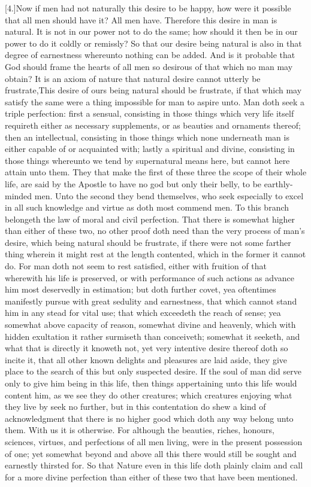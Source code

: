 [4.]Now if men had not naturally this desire to be happy, how were it possible that all men should have it? All men have. Therefore this desire in man is natural. It is not in our power not to do the same; how should it then be in our power to do it coldly or remissly? So that our desire being  natural is also in that degree of earnestness whereunto nothing can be added. And is it probable that God should frame the hearts of all men so desirous of that which no man may obtain? It is an axiom of nature that natural desire cannot utterly be frustrate,This desire of ours being natural should be frustrate, if that which may satisfy the same were a thing impossible for man to aspire unto. Man doth seek a triple perfection: first a sensual, consisting in those things which very life itself requireth either as necessary supplements, or as beauties and ornaments thereof; then an intellectual, consisting in those things which none underneath man is either capable of or acquainted with; lastly a spiritual and divine, consisting in those things whereunto we tend by supernatural means here, but cannot here attain unto them. They that make the first of these three the scope of their whole life, are said by the Apostle to have no god but only their belly, to be earthly-minded men. Unto the second they bend themselves, who seek especially to excel in all such knowledge and virtue as doth most commend men. To this branch belongeth the law of moral and civil perfection. That there is somewhat higher than either of these two, no other proof doth need than the very process of man’s desire, which being natural should be frustrate, if there were not some farther thing wherein it might rest at the length contented, which in the former it cannot do. For man doth not seem to rest satisfied, either with fruition of that wherewith his life is preserved, or with performance of such actions as advance him most deservedly in estimation; but doth further covet, yea oftentimes manifestly pursue with great sedulity and earnestness, that which cannot stand him in any stead for vital use; that which exceedeth the reach of sense; yea somewhat above capacity of reason, somewhat divine and heavenly, which with hidden exultation it rather surmiseth than conceiveth; somewhat it seeketh, and what that is directly it knoweth not, yet very intentive desire thereof doth so incite it, that all other known delights and pleasures are  laid aside, they give place to the search of this but only suspected desire. If the soul of man did serve only to give him being in this life, then things appertaining unto this life would content him, as we see they do other creatures; which creatures enjoying what they live by seek no further, but in this contentation do shew a kind of acknowledgment that there is no higher good which doth any way belong unto them. With us it is otherwise. For although the beauties, riches, honours, sciences, virtues, and perfections of all men living, were in the present possession of one; yet somewhat beyond and above all this there would still be sought and earnestly thirsted for. So that Nature even in this life doth plainly claim and call for a more divine perfection than either of these two that have been mentioned.

